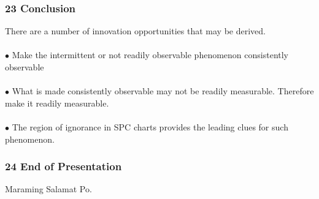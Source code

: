 \documentclass[11pt]{beamer}
\begin{document}
\begin{frame}
\frametitle{23 Conclusion}
\noindent There are a number of innovation opportunities that may be derived. \\ \ \\     $\bullet$ Make the intermittent or not readily observable phenomenon     consistently observable \\ \ \\     $\bullet$ What is made consistently observable may not be readily measurable.     Therefore make it readily measurable. \\ \ \\     $\bullet$ The region of ignorance in SPC charts provides the leading clues     for such phenomenon.

\end{frame}

\begin{frame}
\frametitle{24 End of Presentation}
\noindent Maraming Salamat Po.

\end{frame}
\end{document}
